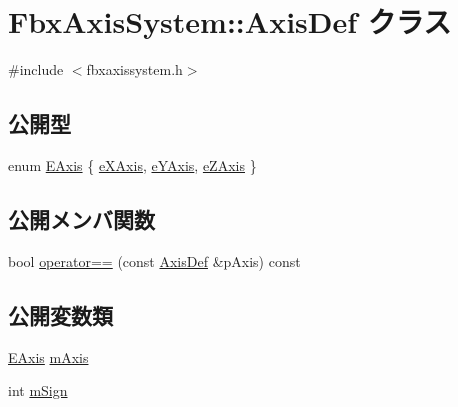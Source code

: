 \hypertarget{class_fbx_axis_system_1_1_axis_def}{}\section{Fbx\+Axis\+System\+:\+:Axis\+Def クラス}
\label{class_fbx_axis_system_1_1_axis_def}


{\ttfamily \#include $<$fbxaxissystem.\+h$>$}

\subsection*{公開型}
\begin{DoxyCompactItemize}
\item 
enum \hyperlink{class_fbx_axis_system_1_1_axis_def_acd082d83d7eff8dad168cf508d30eb54}{E\+Axis} \{ \hyperlink{class_fbx_axis_system_1_1_axis_def_acd082d83d7eff8dad168cf508d30eb54a80d6c8aa584b7818a752b08047d4b5a0}{e\+X\+Axis}, 
\hyperlink{class_fbx_axis_system_1_1_axis_def_acd082d83d7eff8dad168cf508d30eb54a44e081c22001cb951d783f0addbacacc}{e\+Y\+Axis}, 
\hyperlink{class_fbx_axis_system_1_1_axis_def_acd082d83d7eff8dad168cf508d30eb54af7522d3fb3440fbdb4f6484db7b325fb}{e\+Z\+Axis}
 \}
\end{DoxyCompactItemize}
\subsection*{公開メンバ関数}
\begin{DoxyCompactItemize}
\item 
bool \hyperlink{class_fbx_axis_system_1_1_axis_def_a97686e930af5f9528fbe2777f503f547}{operator==} (const \hyperlink{class_fbx_axis_system_1_1_axis_def}{Axis\+Def} \&p\+Axis) const
\end{DoxyCompactItemize}
\subsection*{公開変数類}
\begin{DoxyCompactItemize}
\item 
\hyperlink{class_fbx_axis_system_1_1_axis_def_acd082d83d7eff8dad168cf508d30eb54}{E\+Axis} \hyperlink{class_fbx_axis_system_1_1_axis_def_a5e631800d928b1d20b545ceb94f7b6b2}{m\+Axis}
\item 
int \hyperlink{class_fbx_axis_system_1_1_axis_def_a3d7254aed9f2e6a7ffa2b30e7234dbc0}{m\+Sign}
\end{DoxyCompactItemize}


